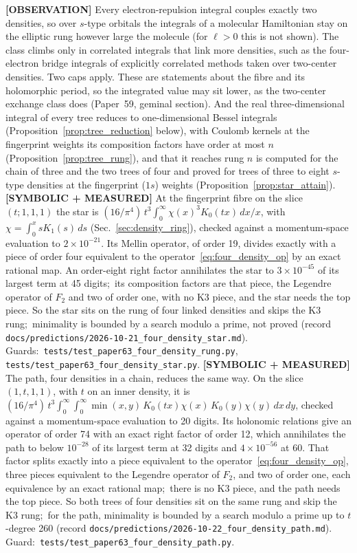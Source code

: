 \documentclass[aps,pra,twocolumn,superscriptaddress,longbibliography]{revtex4-2}
\begin{document}
\textbf{[OBSERVATION]} Every electron-repulsion integral couples exactly
two densities, so over $s$-type orbitals the integrals of a molecular
Hamiltonian stay on the elliptic rung however large the molecule (for
$\ell>0$ this is not shown).  The class climbs only in
correlated integrals that link more densities, such as the four-electron
bridge integrals of explicitly correlated methods taken over two-center
densities.  Two caps apply.  These are statements about the fibre and
its holomorphic period, so the integrated value may sit lower, as the
two-center exchange class does (Paper~59, geminal section).  And the real
three-dimensional integral of every tree reduces to one-dimensional Bessel
integrals (Proposition~\ref{prop:tree_reduction} below), with Coulomb
kernels at the fingerprint weights its composition factors have order at most
$n$ (Proposition~\ref{prop:tree_rung}), and that it
reaches rung $n$ is computed for the chain of three and the two trees of four
and proved for trees of three to eight $s$-type densities at the fingerprint ($1s$) weights (Proposition~\ref{prop:star_attain}).  \textbf{[SYMBOLIC +
MEASURED]} At the fingerprint fibre on the slice $(t;1,1,1)$ the star is
$(16/\pi^4)\,t^3\int_0^\infty\chi(x)^3K_0(tx)\,dx/x$, with
$\chi=\int_0^x sK_1(s)\,ds$ (Sec.~\ref{sec:density_ring}), checked against
a momentum-space evaluation to $2\times10^{-21}$.  Its Mellin operator, of
order 19, divides exactly with a piece of order four equivalent to the
operator~\eqref{eq:four_density_op} by an exact rational map.  An
order-eight right factor annihilates the star to $3\times10^{-45}$ of its
largest term at 45 digits;\ its composition factors are that piece, the
Legendre operator of $F_2$ and two of order one, with no K3 piece, and the
star needs the top piece.  So the star sits on the rung of four linked
densities and skips the K3 rung;\ minimality is bounded by a search modulo
a prime, not proved (record
\texttt{docs/predictions/2026-10-21\_four\_density\_star.md}).  Guards:\
\texttt{tests/test\_paper63\_four\_density\_rung.py},
\texttt{tests/test\_paper63\_four\_density\_star.py}.
\textbf{[SYMBOLIC + MEASURED]} The path, four densities in a chain,
reduces the same way.  On the slice $(1,t,1,1)$, with $t$ on an inner
density, it is
$(16/\pi^4)\,t^3\int_0^\infty\!\int_0^\infty\min(x,y)\,K_0(tx)\chi(x)\,K_0(y)\chi(y)\,dx\,dy$,
checked against a momentum-space evaluation to 20 digits.  Its holonomic
relations give an operator of order 74 with an exact right factor of
order 12, which annihilates the path to below $10^{-28}$ of its largest
term at 32 digits and $4\times10^{-56}$ at 60.  That factor splits exactly
into a piece equivalent to the operator~\eqref{eq:four_density_op}, three
pieces equivalent to the Legendre operator of $F_2$, and two of order
one, each equivalence by an exact rational map;\ there is no K3 piece,
and the path needs the top piece.  So both trees of four densities sit on
the same rung and skip the K3 rung;\ for the path, minimality is bounded
by a search modulo a prime up to $t$-degree 260 (record
\texttt{docs/predictions/2026-10-22\_four\_density\_path.md}).  Guard:\
\texttt{tests/test\_paper63\_four\_density\_path.py}.
\end{document}
